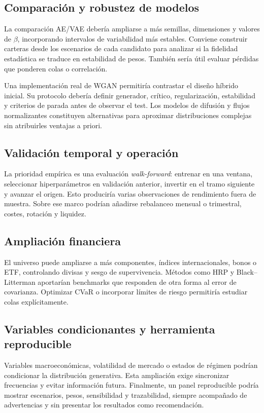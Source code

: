 \subsection{Comparación y robustez de modelos}

La comparación AE/VAE debería ampliarse a más semillas, dimensiones y valores de $\beta$, incorporando intervalos de variabilidad más estables. Conviene construir carteras desde los escenarios de cada candidato para analizar si la fidelidad estadística se traduce en estabilidad de pesos. También sería útil evaluar pérdidas que ponderen colas o correlación.

Una implementación real de WGAN permitiría contrastar el diseño híbrido inicial. Su protocolo debería definir generador, crítico, regularización, estabilidad y criterios de parada antes de observar el test. Los modelos de difusión y flujos normalizantes constituyen alternativas para aproximar distribuciones complejas sin atribuirles ventajas a priori.

\subsection{Validación temporal y operación}

La prioridad empírica es una evaluación \textit{walk-forward}: entrenar en una ventana, seleccionar hiperparámetros en validación anterior, invertir en el tramo siguiente y avanzar el origen. Esto produciría varias observaciones de rendimiento fuera de muestra. Sobre ese marco podrían añadirse rebalanceo mensual o trimestral, costes, rotación y liquidez.

\subsection{Ampliación financiera}

El universo puede ampliarse a más componentes, índices internacionales, bonos o ETF, controlando divisas y sesgo de supervivencia. Métodos como HRP y Black--Litterman aportarían benchmarks que responden de otra forma al error de covarianza. Optimizar CVaR o incorporar límites de riesgo permitiría estudiar colas explícitamente.

\subsection{Variables condicionantes y herramienta reproducible}

Variables macroeconómicas, volatilidad de mercado o estados de régimen podrían condicionar la distribución generativa. Esta ampliación exige sincronizar frecuencias y evitar información futura. Finalmente, un panel reproducible podría mostrar escenarios, pesos, sensibilidad y trazabilidad, siempre acompañado de advertencias y sin presentar los resultados como recomendación.
